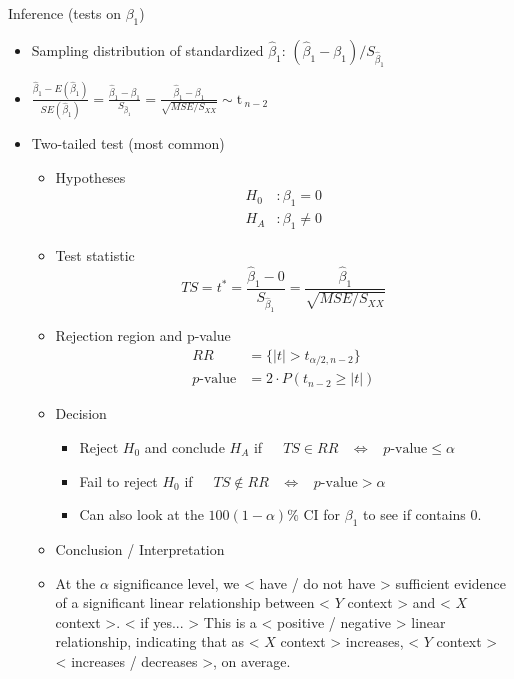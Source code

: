 \documentclass{article}
\begin{document}
Inference (tests on $\beta_1$)
\begin{itemize}
    \item Sampling distribution of standardized $\hat{\beta}_1$: $(\hat{\beta}_1 - \beta_1) / S_{\hat{\beta}_1}$
    \item[] $\displaystyle \frac{\hat{\beta}_1 - E(\hat{\beta}_1)}{SE(\hat{\beta}_1)} = \frac{\hat{\beta}_1 - \beta_1}{S_{\hat{\beta}_1}} = \frac{\hat{\beta}_1 - \beta_1}{\sqrt{MSE / S_{XX}}} \sim \text{t}\,_{n - 2}$
    \item Two-tailed test (most common)
    \begin{itemize}
        \item Hypotheses
        \begin{align*}
          H_0 &: \beta_1 = 0 \\
          H_A &: \beta_1 \ne 0
        \end{align*}
        \item Test statistic
        \[
        TS = t^* = \frac{\hat{\beta}_1 - 0}{S_{\hat{\beta}_1}} = \frac{\hat{\beta}_1}{\sqrt{MSE / S_{XX}}}
        \]
        \item Rejection region and p-value
        \begin{align*}
          RR &= \{\lvert t \rvert > t_{\alpha/2, n - 2}\} \\
          p\text{-value} &= 2 \cdot P(t_{n-2} \ge \lvert t \rvert)
        \end{align*}
        \item Decision
        \begin{itemize}
            \item Reject $H_0$ and conclude $H_A$ if $\hspace{10pt}$ $TS \in RR \hspace{10pt} \Longleftrightarrow \hspace{10pt} p\text{-value} \le \alpha$
            \item Fail to reject $H_0$ if $\hspace{10pt}$ $TS \notin RR \hspace{10pt} \Longleftrightarrow \hspace{10pt} p\text{-value} > \alpha$
            \item Can also look at the $100(1 - \alpha)\%$ CI for $\beta_1$ to see if contains 0.
        \end{itemize}
        \item Conclusion / Interpretation
        \item[] At the $\alpha$ significance level, we < have / do not have > sufficient evidence of a significant linear relationship between < $Y$ context > and < $X$ context >. < if yes... > This is a < positive / negative > linear relationship, indicating that as < $X$ context > increases, < $Y$ context > < increases / decreases >, on average.
    \end{itemize}
\end{itemize}\bigskip
\end{document}
